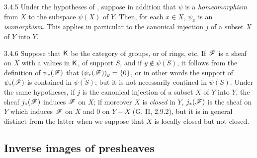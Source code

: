 \begin{env}{3.4.5}
\label{env-0.3.4.5}
Under the hypotheses of , suppose in addition that $\psi$ is a
\emph{homeomorphism} from $X$ to the subspace $\psi(X)$ of $Y$. Then, for each $x\in X$,
$\psi_x$ is an \emph{isomorphism}. This applies in particular to the canonical injection $j$
of a subset $X$ of $Y$ into $Y$.
\end{env}

\begin{env}{3.4.6}
\label{env-0.3.4.6}
Suppose that $\mathsf{K}$ be the category of groups, or of rings, etc. If $\mathscr{F}$ is a sheaf on $X$
with a values in $\mathsf{K}$, of support $S$, and if $y\not\in\overline{\psi(S)}$, it follows from
the definition of $\psi_*(\mathscr{F})$ that $(\psi_*(\mathscr{F}))_y=\{0\}$, or in other words the
support of $\psi_*(\mathscr{F})$ is contained in $\overline{\psi(S)}$; but it is not necessarily
contined in $\psi(S)$. Under the same hypotheses, if $j$ is the canonical injection of a
subset $X$ of $Y$ into $Y$, the sheaf $j_*(\mathscr{F})$ induces $\mathscr{F}$ on $X$; if moreover
$X$ is \emph{closed} in $Y$, $j_*(\mathscr{F})$ is the sheaf on $Y$ which induces $\mathscr{F}$ on $X$
and $0$ on $Y-X$ (G, II, 2.9.2), but it is in general distinct from the latter when we
suppose that $X$ is locally closed but not closed.
\end{env}

\subsection{Inverse images of presheaves}
\label{0-prelim-3.5}

